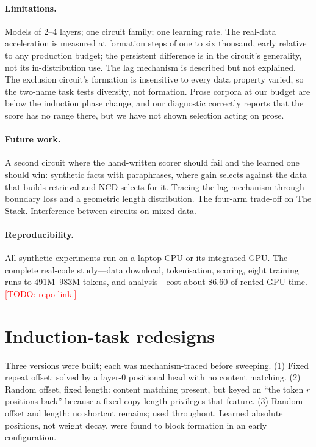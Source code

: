 \documentclass[11pt]{article}
\newcommand{\todo}[1]{\textcolor{red}{[TODO: #1]}}
\newcommand{\ncd}{\mathrm{NCD}}
\begin{document}
\paragraph{Limitations.}
Models of 2--4 layers; one circuit family; one learning rate. The
real-data acceleration is measured at formation steps of one to six
thousand, early relative to any production budget; the persistent
difference is in the circuit's generality, not its in-distribution use.
The lag mechanism is described but not explained. The exclusion circuit's
formation is insensitive to every data property varied, so the two-name
task tests diversity, not formation. Prose corpora at our budget are below
the induction phase change, and our diagnostic correctly reports that the
score has no range there, but we have not shown selection acting on prose.

\paragraph{Future work.}
A second circuit where the hand-written scorer should fail and the learned
one should win: synthetic facts with paraphrases, where gain selects
against the data that builds retrieval and $\ncd$ selects for it. Tracing
the lag mechanism through boundary loss and a geometric length
distribution. The four-arm trade-off on The Stack. Interference between
circuits on mixed data.

\paragraph{Reproducibility.}
All synthetic experiments run on a laptop CPU or its integrated GPU. The
complete real-code study---data download, tokenisation, scoring, eight
training runs to 491M--983M tokens, and analysis---cost about \$6.60 of
rented GPU time. \todo{repo link.}




\appendix
\section{Induction-task redesigns}\label{app:redesign}
Three versions were built; each was mechanism-traced before sweeping.
(1) Fixed repeat offset: solved by a layer-0 positional head with no content
matching. (2) Random offset, fixed length: content matching present, but
keyed on ``the token $r$ positions back'' because a fixed copy length
privileges that feature. (3) Random offset and length: no shortcut
remains; used throughout. Learned absolute positions, not weight decay,
were found to block formation in an early configuration.
\end{document}
